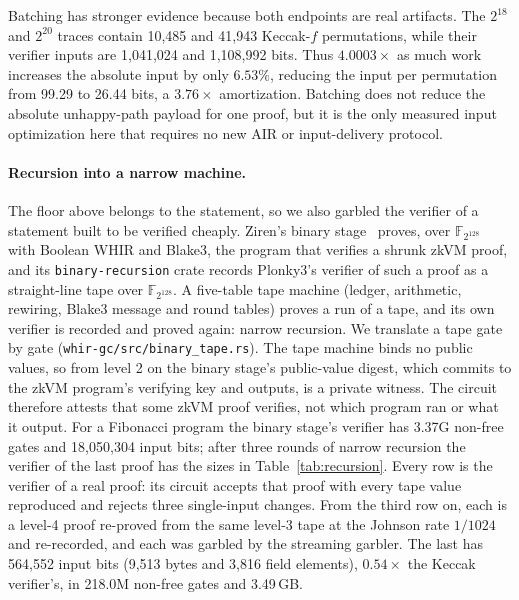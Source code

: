 \documentclass[11pt]{article}
\newcommand{\F}{\mathbb{F}_{2^{128}}}
\begin{document}
Batching has stronger evidence because both endpoints are real artifacts. The
$2^{18}$ and $2^{20}$ traces contain 10{,}485 and 41{,}943 Keccak-$f$
permutations, while their verifier inputs are 1{,}041{,}024 and 1{,}108{,}992
bits. Thus $4.0003\times$ as much work increases the absolute input by only
$6.53\%$, reducing the input per permutation from 99.29 to 26.44 bits, a
$3.76\times$ amortization. Batching does not reduce the absolute unhappy-path
payload for one proof, but it is the only measured input optimization here that
requires no new AIR or input-delivery protocol.

\paragraph{Recursion into a narrow machine.} The floor above belongs to the
statement, so we also garbled the verifier of a statement built to be verified
cheaply. Ziren's binary stage~\cite{ziren} proves, over $\F$ with Boolean WHIR
and Blake3, the program that verifies a shrunk zkVM proof, and its
\texttt{binary-recursion} crate records Plonky3's verifier of such a proof as a
straight-line tape over $\F$. A five-table tape machine (ledger, arithmetic,
rewiring, Blake3 message and round tables) proves a run of a tape, and its own
verifier is recorded and proved again: narrow recursion. We translate a tape
gate by gate (\texttt{whir-gc/src/binary\_tape.rs}). The tape machine binds no
public values, so from level 2 on the binary stage's public-value digest, which
commits to the zkVM program's verifying key and outputs, is a private witness.
The circuit therefore attests that some zkVM proof verifies, not which program
ran or what it output. For a Fibonacci program the
binary stage's verifier has 3.37G non-free gates and 18{,}050{,}304 input bits;
after three rounds of narrow recursion the verifier of the last proof has the
sizes in Table~\ref{tab:recursion}. Every row is the verifier of a real proof:
its circuit accepts that proof with every tape value reproduced and rejects
three single-input changes. From the third row on, each is a level-4 proof
re-proved from the same level-3 tape at the Johnson rate $1/1024$ and
re-recorded, and each was garbled by the streaming garbler. The last has
564{,}552 input bits (9{,}513 bytes and 3{,}816 field elements), $0.54\times$
the Keccak verifier's, in 218.0M non-free gates and 3.49\,GB.
\end{document}
